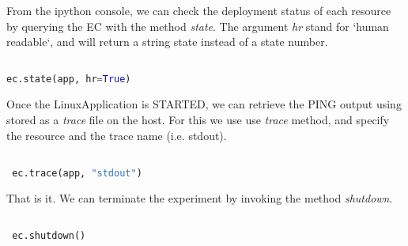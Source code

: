 From the ipython console, we can check the deployment status of each resource
by querying the EC with the method \emph{state}.
The argument \emph{hr} stand for `human readable`, and will return a string 
state instead of a state number.

\begin{lstlisting}[language=Python]

ec.state(app, hr=True)

\end{lstlisting}

Once the LinuxApplication is STARTED, we can retrieve the PING output using
stored as a \emph{trace} file on the host. For this we use use \emph{trace}
method, and specify the resource and the trace name (i.e. stdout).

\begin{lstlisting}[language=Python]

 ec.trace(app, "stdout")

\end{lstlisting}

That is it. We can terminate the experiment by invoking the method \emph{shutdown}.

\begin{lstlisting}[language=Python]

 ec.shutdown()

\end{lstlisting}



